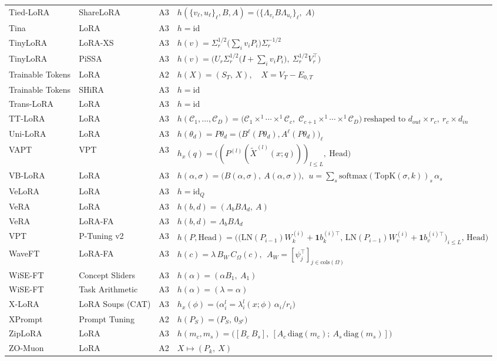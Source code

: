\begin{longtable}{@{}>{\raggedright\arraybackslash}p{2.4cm}>{\raggedright\arraybackslash}p{2.4cm}c>{\raggedright\arraybackslash}p{8.6cm}@{}}
Tied-LoRA & ShareLoRA & A3 & $h(\{v_\ell,u_\ell\}_\ell,B,A)=\big(\{\Lambda_{v_\ell}B\Lambda_{u_\ell}\}_\ell,\;A\big)$\\
Tina & LoRA & A3 & $h=\mathrm{id}$\\
TinyLoRA & LoRA-XS & A3 & $h(v)=\Sigma_r^{1/2}\Big(\sum_iv_iP_i\Big)\Sigma_r^{-1/2}$\\
TinyLoRA & PiSSA & A3 & $h(v)=\Big(U_r\Sigma_r^{1/2}\big(I+\textstyle\sum_iv_iP_i\big),\ \Sigma_r^{1/2}V_r^\top\Big)$\\
Trainable Tokens & LoRA & A2 & $h(X)=(S_T,\,X),\quad X=V_T-E_{0,T}$\\
Trainable Tokens & SHiRA & A3 & $h=\mathrm{id}$\\
Trans-LoRA & LoRA & A3 & $h=\mathrm{id}$\\
TT-LoRA & LoRA & A3 & $h(\mathcal C_1,\dots,\mathcal C_D)=\big(\mathcal C_1\times^1\cdots\times^1\mathcal C_c,\;\mathcal C_{c+1}\times^1\cdots\times^1\mathcal C_D\big)\ \text{reshaped to }d_{out}\times r_c,\ r_c\times d_{in}$\\
Uni-LoRA & LoRA & A3 & $h(\theta_d)=P\theta_d=\big(B^\ell(P\theta_d),A^\ell(P\theta_d)\big)_\ell$\\
VAPT & VPT & A3 & $h_x(q)=\big((P^{(l)}(\tilde X^{(l)}(x;q)))_{l\le L},\ \mathrm{Head}\big)$\\
VB-LoRA & LoRA & A3 & $h(\alpha,\sigma)=\big(B(\alpha,\sigma),\ A(\alpha,\sigma)\big),\ \ u=\textstyle\sum_s\mathrm{softmax}(\mathrm{TopK}(\sigma,k))_s\,\alpha_s$\\
VeLoRA & LoRA & A3 & $h=\mathrm{id}_Q$\\
VeRA & LoRA & A3 & $h(b,d)=(\Lambda_bB\Lambda_d,\ A)$\\
VeRA & LoRA-FA & A3 & $h(b,d)=\Lambda_bB\Lambda_d$\\
VPT & P-Tuning v2 & A3 & $h(P,\mathrm{Head})=\Big(\big(\mathrm{LN}(P_{i-1})W_k^{(i)}+\mathbf 1b_k^{(i)\top},\,\mathrm{LN}(P_{i-1})W_v^{(i)}+\mathbf 1b_v^{(i)\top}\big)_{i\le L},\,\mathrm{Head}\Big)$\\
WaveFT & LoRA-FA & A3 & $h(c)=\lambda\,B_W\,C_\Omega(c),\ \ A_W=[\psi_j^\top]_{j\in\mathrm{cols}(\Omega)}$\\
WiSE-FT & Concept Sliders & A3 & $h(\alpha)=(\alpha B_1,\ A_1)$\\
WiSE-FT & Task Arithmetic & A3 & $h(\alpha)=(\lambda=\alpha)$\\
X-LoRA & LoRA Soups (CAT) & A3 & $h_x(\phi)=\big(\alpha_i^{l}=\lambda_i^{l}(x;\phi)\,\alpha_i/r_i\big)$\\
XPrompt & Prompt Tuning & A2 & $h(P_S)=\big(P_S,\,0_{S^c}\big)$\\
ZipLoRA & LoRA & A3 & $h(m_c,m_s)=\big([B_c\ B_s],\ [A_c\,\mathrm{diag}(m_c);\ A_s\,\mathrm{diag}(m_s)]\big)$\\
ZO-Muon & LoRA & A2 & $X\mapsto(P_k,\ X)$\\
\end{longtable}\endgroup
